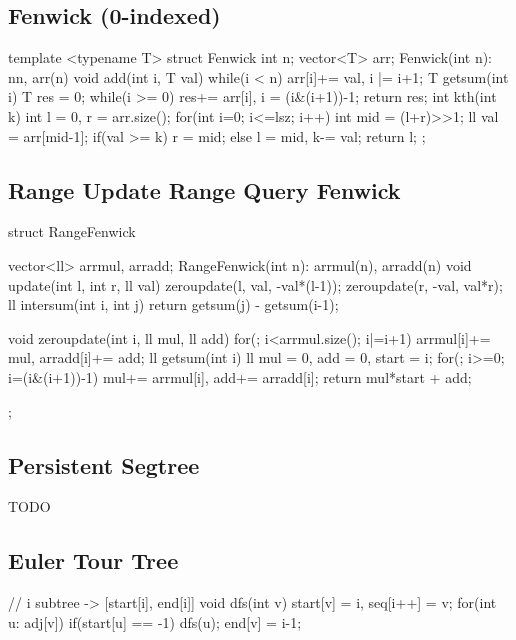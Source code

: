 \subsection{Fenwick (0-indexed)}
\begin{cpp}
template <typename T>
struct Fenwick{
  int n; vector<T> arr;
  Fenwick(int n): n{n}, arr(n) {}
  void add(int i, T val){
    while(i < n) arr[i]+= val, i |= i+1;
  }
  T getsum(int i){
    T res = 0;
    while(i >= 0) res+= arr[i], i = (i&(i+1))-1;
    return res;
  }
  int kth(int k){
    int l = 0, r = arr.size();
    for(int i=0; i<=lsz; i++){
      int mid = (l+r)>>1;
      ll val = arr[mid-1];
      if(val >= k) r = mid;
      else l = mid, k-= val;
    }
    return l;
  }
};
\end{cpp}

\subsection{Range Update Range Query Fenwick}
\begin{cpp}
struct RangeFenwick{
  vector<ll> arrmul, arradd;
  RangeFenwick(int n): arrmul(n), arradd(n){}
  void update(int l, int r, ll val){
    zeroupdate(l, val, -val*(l-1));
    zeroupdate(r, -val, val*r);
  }
  ll intersum(int i, int j){
    return getsum(j) - getsum(i-1);
  }

  void zeroupdate(int i, ll mul, ll add){
    for(; i<arrmul.size(); i|=i+1)
      arrmul[i]+= mul, arradd[i]+= add;
  }
  ll getsum(int i){
    ll mul = 0, add = 0, start = i;
    for(; i>=0; i=(i&(i+1))-1)
      mul+= arrmul[i], add+= arradd[i];
    return mul*start + add;
  }
};
\end{cpp}

\subsection{Persistent Segtree}
TODO

\subsection{Euler Tour Tree}
\begin{cpp}
// i subtree -> [start[i], end[i]]
void dfs(int v){
    start[v] = i, seq[i++] = v;
    for(int u: adj[v]) if(start[u] == -1) dfs(u);
    end[v] = i-1;
}
\end{cpp}

